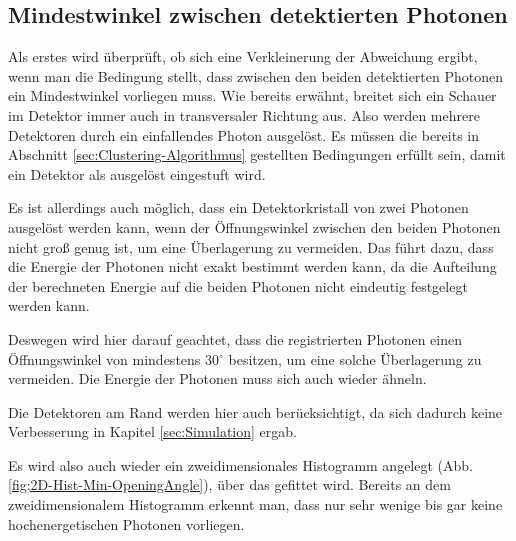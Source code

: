 \documentclass[a4paper,11pt,oneside,final,german,openbib,pdftex]{scrbook}
\begin{document}
{\subsection{Mindestwinkel zwischen detektierten Photonen}
\label{sec:Min-Openingangle}

Als erstes wird \"uberpr\"uft, ob sich eine Verkleinerung der Abweichung ergibt, wenn man die Bedingung stellt, dass zwischen den beiden detektierten Photonen ein Mindestwinkel vorliegen muss. 
Wie bereits erw\"ahnt, breitet sich ein Schauer im Detektor immer auch in transversaler Richtung aus. Also werden mehrere Detektoren durch ein einfallendes Photon ausgel\"ost. 
Es m\"ussen die bereits in Abschnitt \ref{sec:Clustering-Algorithmus} gestellten Bedingungen erf\"ullt sein, damit ein Detektor als ausgel\"ost eingestuft wird.

Es ist allerdings auch m\"oglich, dass ein Detektorkristall von zwei Photonen ausgel\"ost werden kann, wenn der \"Offnungswinkel zwischen den beiden Photonen nicht gro{\ss} genug ist, um eine \"Uberlagerung zu vermeiden. Das f\"uhrt dazu, dass die Energie der Photonen nicht exakt bestimmt werden kann, da die Aufteilung der berechneten Energie auf die beiden Photonen nicht eindeutig festgelegt werden kann.

Deswegen wird hier darauf geachtet, dass die registrierten Photonen einen \"Offnungswinkel von mindestens 30$^{\circ}$ besitzen, um eine solche \"Uberlagerung zu vermeiden.
Die Energie der Photonen muss sich auch wieder \"ahneln.

Die Detektoren am Rand werden hier auch ber\"ucksichtigt, da sich dadurch keine Verbesserung in Kapitel \ref{sec:Simulation} ergab.

Es wird also auch wieder ein zweidimensionales Histogramm angelegt (Abb. \ref{fig;2D-Hist-Min-OpeningAngle}), \"uber das gefittet wird. Bereits an dem zweidimensionalem Histogramm erkennt man, dass nur sehr wenige bis gar keine hochenergetischen Photonen vorliegen.

}
\end{document}
